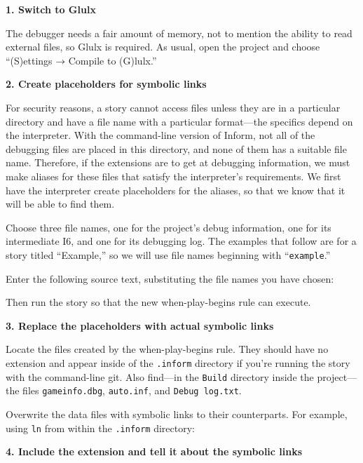 \documentclass{book}
\newcommand{\nil}{{\null}}
\newcommand{\thento}{\(\nil\rightarrow\nil\)}
\begin{document}
\textbf{1. Switch to Glulx}

The debugger needs a fair amount of memory, not to mention the ability to read
external files, so Glulx is required.  As usual, open the project and choose
``(S)ettings\thento Compile to (G)lulx.''

\textbf{2. Create placeholders for symbolic links}

For security reasons, a story cannot access files unless they are in a
particular directory and have a file name with a particular format---the
specifics depend on the interpreter.  With the command-line version of Inform,
not all of the debugging files are placed in this directory, and none of them
has a suitable file name.  Therefore, if the extensions are to get at debugging
information, we must make aliases for these files that satisfy the interpreter's
requirements.  We first have the interpreter create placeholders for the
aliases, so that we know that it will be able to find them.

Choose three file names, one for the project's debug information, one for its
intermediate I6, and one for its debugging log.  The examples that follow are
for a story titled ``Example,'' so we will use file names beginning with
``\texttt{example}.''

Enter the following source text, substituting the file names you have chosen:

\begin{quote}
  
\end{quote}

Then run the story so that the new when-play-begins rule can execute.

\textbf{3. Replace the placeholders with actual symbolic links}

Locate the files created by the when-play-begins rule.  They should have no
extension and appear inside of the \texttt{.inform} directory if you're running
the story with the command-line git.  Also find---in the \texttt{Build}
directory inside the project---the files \texttt{gameinfo.dbg},
\texttt{auto.inf}, and \texttt{Debug log.txt}.

Overwrite the data files with symbolic links to their counterparts.  For
example, using \texttt{ln} from within the \texttt{.inform} directory:

\begin{quote}
  
\end{quote}

\textbf{4. Include the extension and tell it about the symbolic links}
\end{document}
